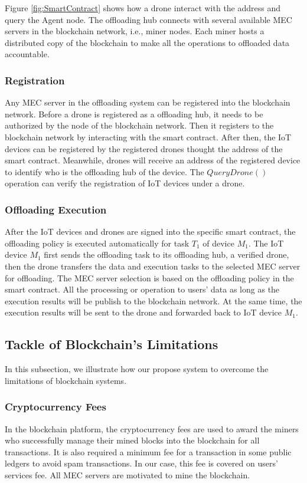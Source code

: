 Figure \ref{fig:SmartContract}  shows how a drone interact with the address and query the Agent node. 
The offloading hub connects with several available MEC servers in the blockchain network, i.e., miner nodes.
 Each miner hosts a distributed copy of the blockchain to make all the operations to offloaded data accountable.

\subsubsection{Registration}
 Any MEC server in the offloading system can be registered into the blockchain network. 
Before a drone is registered as a offloading hub, it needs to be authorized by the node of the blockchain network.
 Then it registers to the blockchain network by interacting with the smart contract. 
 After then, the IoT devices can be registered by the registered drones thought the address of the smart contract.
 Meanwhile, drones  will receive an address of the registered device to identify who is the offloading hub of the device.
 The $QueryDrone()$ operation can verify the registration of IoT devices under a drone.



\subsubsection{Offloading Execution}
After the IoT devices and drones are signed into the specific smart contract, the offloading policy is executed automatically for task $T_1$ of device $M_1$.
The IoT device $M_1$ first sends the offloading task to its offloading hub, a verified drone, then the drone transfers the data and execution tasks to the selected MEC server for offloading.
The MEC server selection is based on the offloading policy in the smart contract.
All the processing or operation to users' data as long as the execution results will be publish to the blockchain network. At the same time, the execution results will be sent to the drone and forwarded back to IoT device $M_1$.


\subsection{Tackle of Blockchain's Limitations}
In this subsection, we illustrate how our propose system to overcome the limitations of blockchain systems.

\subsubsection{Cryptocurrency Fees}
In the blockchain platform, the cryptocurrency fees are used to award the miners who successfully manage their mined blocks into the blockchain for all transactions.
It is also required a minimum fee for a transaction in some public ledgers to avoid spam transactions. In our case, this fee is covered on users' services fee. All MEC servers are motivated to mine the blockchain. 

